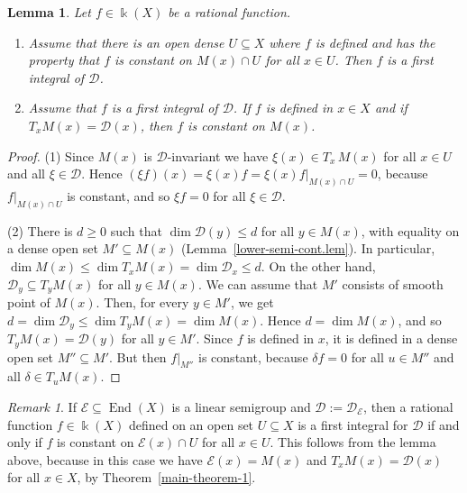 \documentclass{amsart}
\newtheorem{lem}[thm]{Lemma}
\theoremstyle{definition}
\theoremstyle{remark}
\newtheorem{rem}[thm]{Remark}
\begin{document}
\begin{lem}\label{first-integral.lem}
Let $f \in {\Bbbk}(X)$ be a rational function.
\begin{enumerate}
\item
Assume that there is an open dense $U {\subseteq} X$ where $f$ is defined and has the property that $f$ is constant on $M(x)\cap U$ for all $x \in U$. Then $f$ is a first integral of ${\mathcal D}$.
\item
Assume that $f$ is a first integral of ${\mathcal D}$. If $f$ is defined in $x \in X$ and if $T_{x}M(x) = {\mathcal D}(x)$, then $f$ is constant on $M(x)$.
\end{enumerate}
\end{lem}
\begin{proof}
(1) Since $M(x)$ is ${\mathcal D}$-invariant we have $\xi(x) \in T_{x}\,M(x)$ for all $x \in U$ and all $\xi \in {\mathcal D}$. Hence $(\xi f)(x) = \xi(x) f = \xi(x) f|_{M(x)\cap U} = 0$, because $f|_{M(x)\cap U}$ is constant, and so $\xi f = 0$ for all $\xi \in {\mathcal D}$.
\par\smallskip
(2) There is $d\geq 0$ such that $\dim {\mathcal D}(y)\leq d$ for all $y \in M(x)$, with equality on a dense open set $M' {\subseteq} M(x)$ (Lemma~\ref{lower-semi-cont.lem}). In particular, $\dim M(x) \leq \dim T_{x}M(x) = \dim {\mathcal D}_{x} \leq d$. On the other hand, ${\mathcal D}_{y}{\subseteq} T_{y}M(x)$ for all $y \in M(x)$. We can assume that $M'$ consists of smooth point of $M(x)$. Then, for every $y \in M'$, we get $d=\dim {\mathcal D}_{y}\leq \dim T_{y}M(x) = \dim M(x)$. Hence $d = \dim M(x)$, and so $T_{y}M(x)={\mathcal D}(y)$ for all $y\in M'$. 
Since $f$ is defined in $x$, it is defined in a dense open set $M''{\subseteq} M'$. But then $f|_{M''}$ is constant, because $\delta f=0$ for all $u \in M''$ and all $\delta \in T_{u}M(x)$.
\end{proof}
\begin{rem}\label{first-integral.rem}
If ${\mathcal E} {\subseteq} \operatorname{End}(X)$ is a linear semigroup and ${\mathcal D}:={\mathcal D}_{\mathcal E}$, then a rational function $f\in{\Bbbk}(X)$ defined on an open set $U {\subseteq} X$ is a first integral for ${\mathcal D}$ if and only if $f$ is constant on ${\mathcal E}(x)\cap U$ for all $x \in U$. This follows from the lemma above, because in this case we have ${\mathcal E}(x) = M(x)$ and  $T_{x}M(x) = {\mathcal D}(x)$ for all $x \in X$, by Theorem~\ref{main-theorem-1}.
\end{rem}
\end{document}
